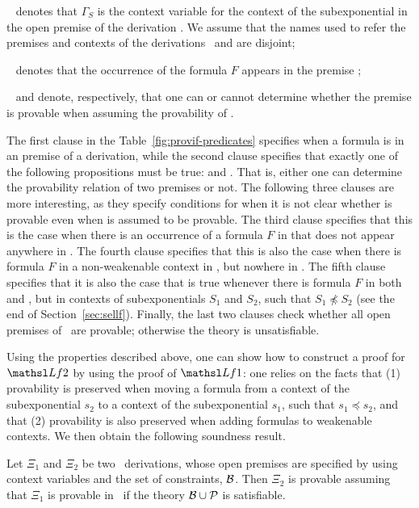 \noindent
\textbullet~ denotes that 
$\Gamma_S$ is the context variable for the context of the subexponential
 in the open premise  of the derivation . We
assume that the names used to refer the premises and contexts of the 
derivations \derOne\ and \derTwo are disjoint;

\noindent
\textbullet~ denotes that the occurrence of the formula
$F$ appears in the premise ;

\noindent
\textbullet~ and
 denote, respectively, that one can or
cannot determine whether the premise  is
provable when assuming the provability of .

The first clause in the Table~\ref{fig:provif-predicates} specifies when 
a formula is in an premise of a derivation, while the second clause 
specifies that exactly one of the following propositions
must be true:  and
. That is, either one can determine the
provability relation of two premises or not. The following three clauses
are more interesting, as they specify conditions for when it is not clear
whether  is provable even when  is assumed to be
provable. The third clause specifies that this is the case when there is
an occurrence of a formula $F$ in  that does not appear anywhere
in . The fourth clause specifies that this is also the case when
there is formula $F$ in a non-weakenable context in , but nowhere
in . The fifth clause specifies that
it is also the case that  is true whenever
there is formula $F$ in both  and , but in contexts of
subexponentials $S_1$ and $S_2$, such that $S_1 \npreceq S_2$ (see the
end of Section~\ref{sec:sellf}). Finally, the last two clauses check
whether all open premises of \derTwo\ are provable; otherwise the theory
is unsatisfiable.

Using the properties described above, one can show how to construct a proof
for 
$\tsl{Lf2}$ by using the proof of $\tsl{Lf1}$: one relies on  
the facts that (1) provability is preserved when moving a formula from a
context of the subexponential $s_2$ to a context of the
subexponential $s_1$, such that $s_1 \preceq s_2$, and that (2)
provability is also preserved when adding formulas to weakenable contexts.
We then obtain the following soundness result.

\begin{theorem}
Let $\Xi_1$ and $\Xi_2$ be two \sellf\ derivations, whose open premises are
specified by using context variables and the set of constraints,
$\mathcal{B}$. Then $\Xi_2$ is
provable assuming that $\Xi_1$ is provable in \sellf\ if 
the theory $\mathcal{B} \cup {\cal P}$ is satisfiable.
\end{theorem}


